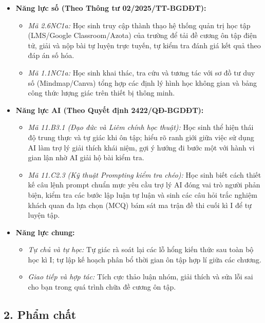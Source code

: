 \documentclass[12pt, a4paper]{article}
\begin{document}
\begin{itemize}[leftmargin=1.2cm]
    \item \textbf{Năng lực số (Theo Thông tư 02/2025/TT-BGDĐT):}
    \begin{itemize}[leftmargin=0.6cm]
        \item \textit{Mã 2.6NC1a:} Học sinh truy cập thành thạo hệ thống quản trị học tập (LMS/Google Classroom/Azota) của trường để tải đề cương ôn tập điện tử, giải và nộp bài tự luyện trực tuyến, tự kiểm tra đánh giá kết quả theo đáp án số hóa.
        \item \textit{Mã 1.1NC1a:} Học sinh khai thác, tra cứu và tương tác với sơ đồ tư duy số (Mindmap/Canva) tổng hợp các định lý hình học không gian và bảng công thức lượng giác trên thiết bị thông minh.
    \end{itemize}

    \item \textbf{Năng lực AI (Theo Quyết định 2422/QĐ-BGDĐT):}
    \begin{itemize}[leftmargin=0.6cm]
        \item \textit{Mã 11.B3.1 (Đạo đức và Liêm chính học thuật):} Học sinh thể hiện thái độ trung thực và tự giác khi ôn tập; hiểu rõ ranh giới giữa việc sử dụng AI làm trợ lý giải thích khái niệm, gợi ý hướng đi bước một với hành vi gian lận nhờ AI giải hộ bài kiểm tra.
        \item \textit{Mã 11.C2.3 (Kỹ thuật Prompting kiểm tra chéo):} Học sinh biết cách thiết kế câu lệnh prompt chuẩn mực yêu cầu trợ lý AI đóng vai trò người phản biện, kiểm tra các bước lập luận tự luận và sinh các câu hỏi trắc nghiệm khách quan đa lựa chọn (MCQ) bám sát ma trận đề thi cuối kì I để tự luyện tập.
    \end{itemize}

    \item \textbf{Năng lực chung:}
    \begin{itemize}[leftmargin=0.6cm]
        \item \textit{Tự chủ và tự học:} Tự giác rà soát lại các lỗ hổng kiến thức sau toàn bộ học kì I; tự lập kế hoạch phân bổ thời gian ôn tập hợp lí giữa các chương.
        \item \textit{Giao tiếp và hợp tác:} Tích cực thảo luận nhóm, giải thích và sửa lỗi sai cho bạn trong quá trình chữa đề cương ôn tập.
    \end{itemize}
\end{itemize}

\subsection*{2. Phẩm chất}
\end{document}
